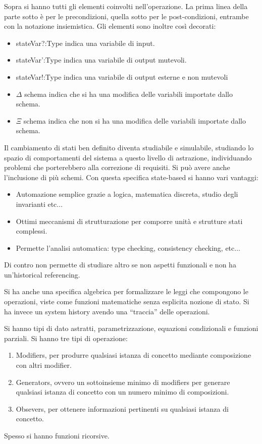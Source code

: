 Sopra si hanno tutti gli elementi coinvolti nell'operazione. La prima linea della
parte sotto è per le precondizioni, quella sotto per le post-condizioni, entrambe
con la notazione insiemistica. Gli elementi sono inoltre così decorati:
\begin{itemize}
      \item stateVar?:Type indica una variabile di input.
      \item stateVar':Type indica una variabile di output mutevoli.
      \item stateVar!:Type indica una variabile di output esterne e non mutevoli
      \item $\Delta$ schema indica che si ha una modifica delle variabili importate
            dallo schema.
      \item $\Xi$ schema indica che non si ha una modifica delle variabili importate
            dallo schema.
\end{itemize}
Il cambiamento di stati ben definito diventa studiabile e simulabile, studiando
lo spazio di comportamenti del sistema a questo livello di astrazione,
individuando problemi che porterebbero alla correzione di requisiti. Si può avere
anche l'inclusione di più schemi. Con questa specifica state-based si hanno vari
vantaggi:
\begin{itemize}
      \item Automazione semplice grazie a logica, matematica discreta, studio
            degli invarianti etc$\dots$
      \item Ottimi meccanismi di strutturazione per comporre unità e strutture
            stati complessi.
      \item Permette l'analisi automatica: type checking, consistency checking,
            etc$\dots$
\end{itemize}
Di contro non permette di studiare altro se non aspetti funzionali e non ha
un'historical referencing.

Si ha anche una specifica algebrica per formalizzare le leggi che compongono le
operazioni, viste come funzioni matematiche senza esplicita nozione di stato.
Si ha invece un system history avendo una “traccia” delle operazioni.

Si hanno tipi di dato astratti, parametrizzazione, equazioni condizionali e funzioni
parziali. Si hanno tre tipi di operazione:
\begin{enumerate}
      \item Modifiers, per produrre qualsiasi istanza di concetto mediante
            composizione con altri modifier.
      \item Generators, ovvero un sottoinsieme minimo di modifiers per generare
            qualsiasi istanza di concetto con un numero minimo di composizioni.
      \item Obsevers, per ottenere informazioni pertinenti su qualsiasi istanza
            di concetto.
\end{enumerate}
Spesso si hanno funzioni ricorsive.

